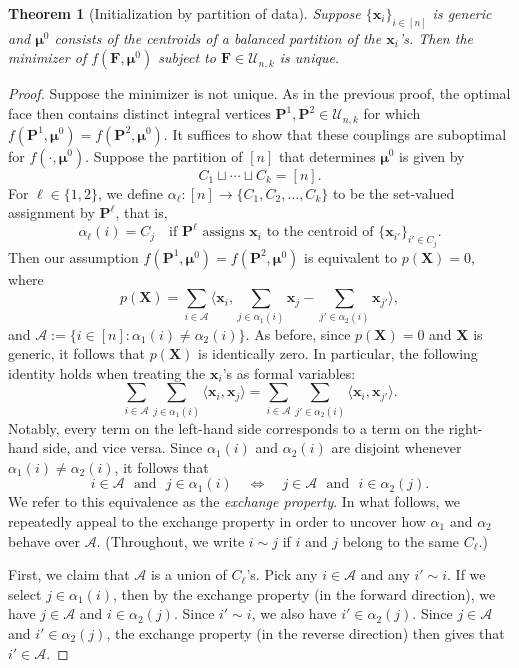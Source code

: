 \documentclass{article}
\theoremstyle{plain}
\newtheorem{theorem}{Theorem}
\theoremstyle{definition}
\newcommand{\1}{\mathbf{1}}
\newcommand{\bUnk}{\mathcal{U}_{n,k}}
\newcommand{\la}{\big\langle}
\newcommand{\ra}{\big\rangle}
\newcommand{\bmF}{\bm{F}}
\newcommand{\bmu}{\bm{\mu}}
\newcommand{\cA}{\mathcal{A}}
\begin{document}
\begin{theorem}[Initialization by partition of data]\label{thm.generic initialization by partition}
Suppose $\{\bm{x}_i\}_{i\in[n]}$ is generic and $\bmu^0$ consists of the centroids of a balanced partition of the $\bm{x}_i$'s.
Then the minimizer of $f(\bmF,\bmu^0)$ subject to $\bmF\in\bUnk$ is unique.
\end{theorem}


\begin{proof}
Suppose the minimizer is not unique.  As in the previous proof, the optimal face then contains distinct integral vertices $\bm{P}^1,\bm{P}^2\in\bUnk$ for which $f(\bm{P}^1,\bmu^0)=f(\bm{P}^2,\bmu^0)$.  It suffices to show that these couplings are suboptimal for $f(\cdot,\bmu^0)$.
Suppose the partition of $[n]$ that determines $\bmu^0$ is given by 
\[
C_1\sqcup \cdots \sqcup C_k 
= [n].
\]
For $\ell\in \{1,2 \}$, we define $\alpha_\ell\colon [n]\to \{ C_1, C_2,\dotsc, C_k\}$ to be the set-valued assignment by $\bm{P}^\ell$, that is,
\[
\alpha_\ell(i) 
= C_j\quad \text{if $\bm{P}^\ell$ assigns $\bm{x}_i$ to the centroid of $\{\bm{x}_{i'}\}_{i'\in C_j}$}.
\] 
Then our assumption $f(\bm{P}^1,\bmu^0)=f(\bm{P}^2,\bmu^0)$ is equivalent to $p(\bm{X})=0$, where
\[
p(\bm{X}) 
= \sum_{i\in \cA} \la \bm{x}_i , \sum_{j\in \alpha_1(i)} \bm{x}_j - \sum_{j' \in \alpha_2(i) } \bm{x}_{j'}  \ra,
\]
and $\cA := \{ i\in [n]: \alpha_1(i) \neq \alpha_2(i)\}$.
As before, since $p(\bm{X})=0$ and $\bm{X}$ is generic, it follows that $p(\bm{X})$ is identically zero.
In particular, the following identity holds when treating the $\bm{x}_i$'s as formal variables:
\[
\sum_{i\in \cA}\sum_{j\in \alpha_1(i)} \la \bm{x}_i ,  \bm{x}_j \ra 
= \sum_{i\in \cA} \sum_{j' \in \alpha_2(i) } \la \bm{x}_i,\bm{x}_{j'}  \ra.
\]
Notably, every term on the left-hand side corresponds to a term on the right-hand side, and vice versa.
Since $\alpha_1(i)$ and $\alpha_2(i)$ are disjoint whenever $\alpha_1(i)\neq\alpha_2(i)$, it follows that
\[
\text{$i\in \cA$ ~and~ $j\in \alpha_1(i)$}
\quad
\Longleftrightarrow
\quad
\text{$j \in \cA$ ~and~ $i\in \alpha_2(j)$}.
\]
We refer to this equivalence as the \textit{exchange property}.
In what follows, we repeatedly appeal to the exchange property in order to uncover how $\alpha_1$ and $\alpha_2$ behave over $\cA$.
(Throughout, we write $i\sim j$ if $i$ and $j$ belong to the same $C_\ell$.)

First, we claim that $\cA$ is a union of $C_\ell$'s. 
Pick any $i\in\cA$ and any $i'\sim i$.
If we select $j\in\alpha_1(i)$, then by the exchange property (in the forward direction), we have $j\in\cA$ and $i\in\alpha_2(j)$.
Since $i'\sim i$, we also have $i'\in\alpha_2(j)$.
Since $j\in\cA$ and $i'\in\alpha_2(j)$, the exchange property (in the reverse direction) then gives that $i'\in\cA$.


\end{proof}
\end{document}
